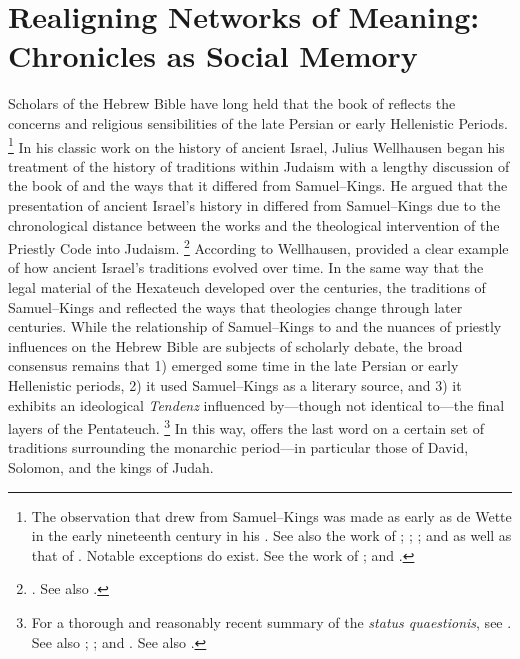 
\chapter{Realigning Networks of Meaning: Chronicles as Social Memory}
\label{chap:chronicles}

Scholars of the Hebrew Bible have long held that the book of \chronicles reflects the concerns and religious sensibilities of the late Persian or early Hellenistic Periods.%
    \footnote{The observation that \chronicles drew from Samuel--Kings was made as early as de Wette in the early nineteenth century in his \cite*{dewette1806}. See also the work of
        \cite{mckenzie1985};
        \cite{mckenzie_graham-mckenzie1999};
        \cite[66--71]{knoppers2003}; and
        \cite[30--42]{klein2006} as well as that of
        \cite[74]{carr2011}. Notable exceptions do exist. See the work of
        \cite{auld1994};
        \cite{auld_graham-mckenzie1999} and
        \cite{person2010}.}
In his classic work on the history of ancient Israel, Julius Wellhausen began his treatment of the history of traditions within Judaism with a lengthy discussion of the book of \chronicles and the ways that it differed from Samuel--Kings. He argued that the presentation of ancient Israel's history in \chronicles differed from Samuel--Kings due to the chronological distance between the works and the theological intervention of the Priestly Code into \secondtemple Judaism.%
    \footnote{%
        \cite[171--172]{wellhausen1957}. See also
        \cite{wright_ulrich-wright1992}.}
According to Wellhausen, \chronicles provided a clear example of how ancient Israel's traditions evolved over time. In the same way that the legal material of the Hexateuch developed over the centuries, the traditions of Samuel--Kings and \chronicles reflected the ways that  theologies change through later centuries. While the relationship of Samuel--Kings to \chronicles and the nuances of priestly influences on the Hebrew Bible are subjects of scholarly debate, the broad consensus remains that 1) \chronicles emerged some time in the late Persian or early Hellenistic periods, 2) it used Samuel--Kings as a literary source, and 3) it exhibits an ideological \emph{Tendenz} influenced by---though not identical to---the final layers of the Pentateuch.%
    \footnote{For a thorough and reasonably recent summary of the \emph{status quaestionis}, see
        \cite[72--89]{knoppers2003}. See also
        \cite{japhet1993};
        \cite{japhet2009};
        \cite{braun1986} and
        \cite{coggins1976}. See also
        \cite{person_ot2011}.}
In this way, \chronicles offers the last word on a certain set of traditions surrounding the monarchic period---in particular those of David, Solomon, and the kings of Judah.

